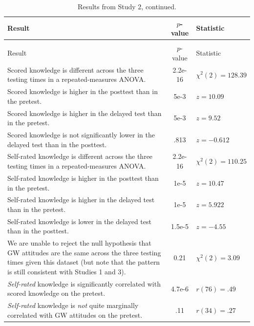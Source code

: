 \begin{longtabu}{X[2.5]S[table-parse-only]X[l]}

\caption{Summary of results from Study 2.\label{table:RPP-mech-results}}\\ 
\toprule
Result & {$p$-value} & Statistic \\ \midrule
\endfirsthead

\caption[]{Results from Study 2, continued.}\\
\toprule
Result & {$p$-value} & Statistic \\ \midrule
\endhead

\bottomrule
\endfoot

Scored knowledge is different across the three testing times in a repeated-measures ANOVA. &
2.2e-16 & $\chi^2(2)=128.39$  \\
Scored knowledge is higher in the posttest than in the pretest. & 5e-3 & $z=10.09$ \\
Scored knowledge is higher in the delayed test than in the pretest. & 5e-3 & $z=9.52$ \\
Scored knowledge is not significantly lower in the delayed test than in the posttest. &
.813 & $z=-0.612$ \\
Self-rated knowledge is different across the three testing times in a repeated-measures ANOVA. &
2.2e-16 & $\chi^2(2)=110.25$ \\
Self-rated knowledge is higher in the posttest than in the pretest. & 1e-5 & $z=10.47$ \\
Self-rated knowledge is higher in the delayed test than in the pretest. & 1e-5 &
$z=5.922$ \\
Self-rated knowledge is lower in the delayed test than in the posttest. &
1.5e-5 & $z=-4.55$ \\
We are unable to reject the null hypothesis that GW attitudes are the same
across the three testing times given this dataset (but note that the pattern is
still consistent with Studies 1 and 3). & 0.21 & $\chi^2(2) = 3.09$ \\
\emph{Self-rated} knowledge is significantly correlated with scored knowledge on the
pretest. & 4.7e-6 & $r(76)=.49$ \\
\emph{Self-rated} knowledge is \emph{not} quite marginally correlated with GW attitudes on
the pretest. & .11 & $r(34)=.27$ \\

\end{longtabu}

